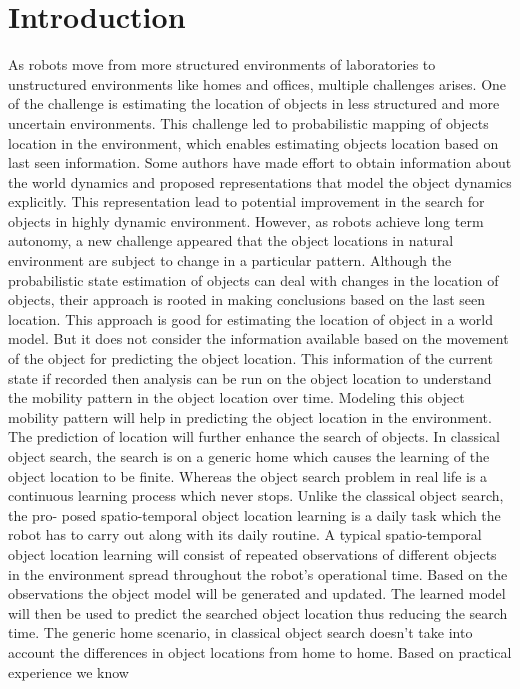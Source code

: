 \documentclass{llncs}
\begin{document}
\section{Introduction}
As robots move from more structured environments of laboratories to unstructured environments like homes and offices, multiple challenges arises. One of the challenge is
estimating the location of objects in less structured and more uncertain environments.
This challenge led to probabilistic mapping of objects location in the environment, which
enables estimating objects location based on last seen information. Some authors have
made effort to obtain information about the world dynamics and proposed representations
that model the object dynamics explicitly. This representation lead to potential improvement in the search for objects in highly dynamic environment. However, as robots achieve
long term autonomy, a new challenge appeared that the object locations in natural environment are subject to change in a particular pattern. Although the probabilistic state
estimation of objects can deal with changes in the location of objects, their approach is
rooted in making conclusions based on the last seen location. This approach is good for
estimating the location of object in a world model. But it does not consider the information available based on the movement of the object for predicting the object location.
This information of the current state if recorded then analysis can be run on the object
location to understand the mobility pattern in the object location over time. Modeling
this object mobility pattern will help in predicting the object location in the environment.
The prediction of location will further enhance the search of objects.
In classical object search, the search is on a generic home which causes the learning
of the object location to be finite. Whereas the object search problem in real life is a
continuous learning process which never stops. Unlike the classical object search, the pro-
posed spatio-temporal object location learning is a daily task which the robot has to carry
out along with its daily routine. A typical spatio-temporal object location learning will
consist of repeated observations of different objects in the environment spread throughout
the robot’s operational time. Based on the observations the object model will be generated
and updated. The learned model will then be used to predict the searched object location
thus reducing the search time.
The generic home scenario, in classical object search doesn’t take into account the
differences in object locations from home to home. Based on practical experience we know
\end{document}
